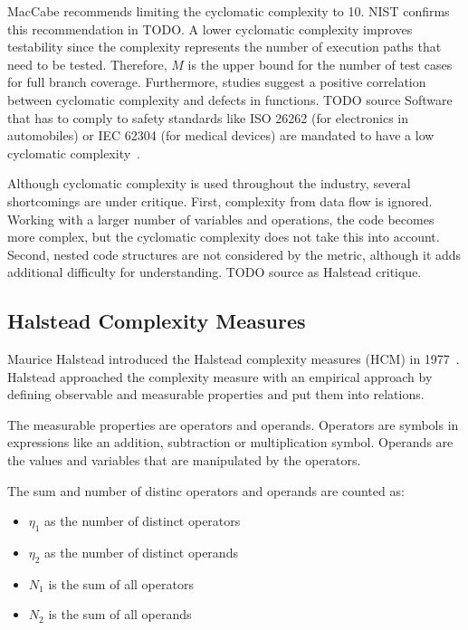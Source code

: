 MacCabe recommends limiting the cyclomatic complexity to 10. NIST confirms this recommendation in TODO. A lower cyclomatic complexity improves testability since the complexity represents the number of execution paths that need to be tested. Therefore, $M$ is the upper bound for the number of test cases for full branch coverage. 
Furthermore, studies suggest a positive correlation between cyclomatic complexity and defects in functions. TODO source
Software that has to comply to safety standards like ISO 26262 (for electronics in automobiles) or IEC 62304 (for medical devices) are mandated to have a low cyclomatic complexity~\cite{isotc_22sc_32_iso_2018, isotisotc_210_iec_2006c_210}.

Although cyclomatic complexity is used throughout the industry, several shortcomings are under critique. First, complexity from data flow is ignored. Working with a larger number of variables and operations, the code becomes more complex, but the cyclomatic complexity does not take this into account. Second, nested code structures are not considered by the metric, although it adds additional difficulty for understanding. TODO source as Halstead critique.

\subsection{Halstead Complexity Measures}
Maurice Halstead introduced the Halstead complexity measures (HCM) in 1977~\cite{halstead1977elements}. Halstead approached the complexity measure with an empirical approach by defining observable and measurable properties and put them into relations.

The measurable properties are operators and operands. Operators are symbols in expressions like an addition, subtraction or multiplication symbol. Operands are the values and variables that are manipulated by the operators. 

The sum and number of distinc operators and operands are counted as:
\begin{itemize}
    \item $\eta_1$ as the number of distinct operators 
    \item $\eta_2$ as the number of distinct operands
    \item $N_1$ is the sum of all operators
    \item $N_2$ is the sum of all operands  
\end{itemize}

